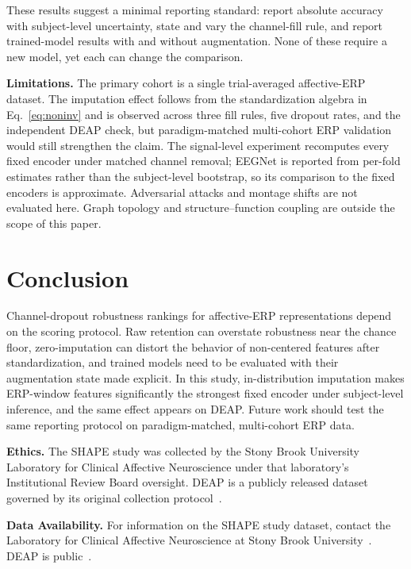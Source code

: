 \documentclass[conference]{IEEEtran}
\begin{document}
These results suggest a minimal reporting standard: report absolute accuracy with subject-level uncertainty, state and vary the channel-fill rule, and report trained-model results with and without augmentation. None of these require a new model, yet each can change the comparison.

\textbf{Limitations.} The primary cohort is a single trial-averaged affective-ERP dataset. The imputation effect follows from the standardization algebra in Eq.~\eqref{eq:noninv} and is observed across three fill rules, five dropout rates, and the independent DEAP check, but paradigm-matched multi-cohort ERP validation would still strengthen the claim. The signal-level experiment recomputes every fixed encoder under matched channel removal; EEGNet is reported from per-fold estimates rather than the subject-level bootstrap, so its comparison to the fixed encoders is approximate. Adversarial attacks and montage shifts are not evaluated here. Graph topology and structure--function coupling are outside the scope of this paper.

\section{Conclusion}
Channel-dropout robustness rankings for affective-ERP representations depend on the scoring protocol. Raw retention can overstate robustness near the chance floor, zero-imputation can distort the behavior of non-centered features after standardization, and trained models need to be evaluated with their augmentation state made explicit. In this study, in-distribution imputation makes ERP-window features significantly the strongest fixed encoder under subject-level inference, and the same effect appears on DEAP. Future work should test the same reporting protocol on paradigm-matched, multi-cohort ERP data.

\textbf{Ethics.} The SHAPE study was collected by the Stony Brook University Laboratory for Clinical Affective Neuroscience under that laboratory's Institutional Review Board oversight. DEAP is a publicly released dataset governed by its original collection protocol~\cite{koelstra2012deap}.

\textbf{Data Availability.} For information on the SHAPE study dataset, contact the Laboratory for Clinical Affective Neuroscience at Stony Brook University~\cite{shape}. DEAP is public~\cite{koelstra2012deap}.
\end{document}
